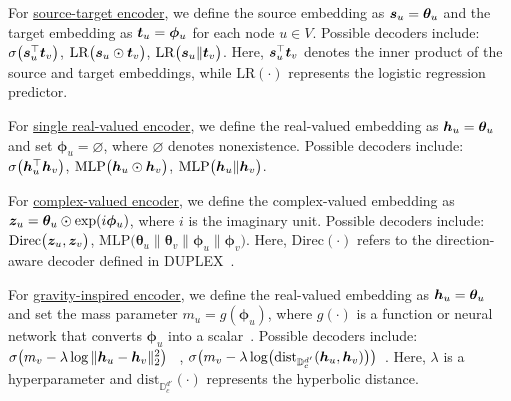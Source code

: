 For \underline{source-target encoder}, we define the source embedding as ${\bm{s}}_u = \bm{\theta}_u$ and the target embedding as ${\bm{t}}_u=\bm{\phi}_u$ for each node $u \in V$. Possible decoders include:
$\sigma\bigl({\bm{s}}_u^{\top}{\bm{t}}_v\bigr)$,  
$\mathrm{LR}\bigl({\bm{s}}_u \odot {\bm{t}}_v\bigr)$,  
$\mathrm{LR}\bigl({\bm{s}}_u \|{\bm{t}}_v\bigr)$.  
Here, ${\bm{s}}_u^{\top}{\bm{t}}_v$ denotes the inner product of the source and target embeddings, while $\mathrm{LR}(\cdot)$ represents the logistic regression predictor.

For \underline{single real-valued encoder}, we define the real-valued embedding as ${\bm{h}}_u = \bm{\theta}_u$ and set $\bm{\phi}_u=\varnothing$, where $\varnothing$ denotes nonexistence. Possible decoders include:
$\sigma\bigl({\bm{h}}_u^{\top}{\bm{h}}_v\bigr)$,  
$\mathrm{MLP}\bigl({\bm{h}}_u \odot {\bm{h}}_v\bigr)$,  
$\mathrm{MLP}\bigl({\bm{h}}_u \|{\bm{h}}_v\bigr)$.  

For \underline{complex-valued encoder}, we define the complex-valued embedding as ${\bm{z}}_u=\bm{\theta}_u\odot\exp({i\bm{\phi}_u})$, where $i$ is the imaginary unit. Possible decoders include:
$\mathrm{Direc}\bigl({\bm{z}}_u,{\bm{z}}_v\bigr)$,  
$\mathrm{MLP}\bigl(\bm{\theta}_u \|\bm{\theta}_v \|\bm{\phi}_u \|\bm{\phi}_v\bigr)$.  
Here, $\mathrm{Direc}(\cdot)$ refers to the direction-aware decoder defined in DUPLEX~\cite{duplex}.

For \underline{gravity-inspired encoder}, we define the real-valued embedding as ${\bm{h}}_u = \bm{\theta}_u$ and set the mass parameter $m_u = g(\bm{\phi}_u)$, where $g(\cdot)$ is a function or neural network that converts $\bm{\phi}_u$ into a scalar~\cite{dhypr}. Possible decoders include:
$\sigma\bigl(m_v - \lambda\log\|{\bm{h}}_u-{\bm{h}}_v\|_2^2\bigr)$ ~\cite{gragae},  
$\sigma\bigl(m_v - \lambda\log \bigl(\mathrm{dist}_{\mathbb{D}_c^{d'}}({\bm{h}}_u,{\bm{h}}_v)\bigr)\bigr)$~\cite{dhypr}.  
Here, $\lambda$ is a hyperparameter and $\mathrm{dist}_{\mathbb{D}_c^{d'}}(\cdot)$ represents the hyperbolic distance.









